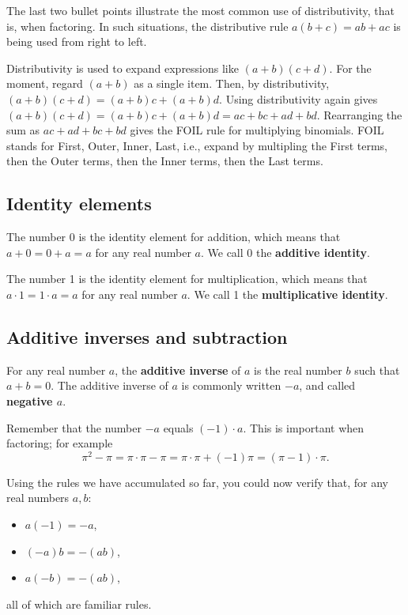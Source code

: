 \documentclass[11pt]{book}               %
\begin{document}
The last two bullet points illustrate the most common use of distributivity, that is, when factoring. 
In such situations, the distributive rule $a (b + c) = ab + a c$  is being used from right to left.

Distributivity is used to expand expressions like $(a + b)(c + d)$.
For the moment, regard $(a + b)$ as a single item.
Then, by distributivity, $(a + b)(c + d) = (a + b)c + (a+b)d$.
Using distributivity again gives $(a + b)(c + d) = (a + b)c + (a+b)d = ac + bc + ad + bd$.
Rearranging the sum as $ac + ad + bc + bd$ gives  the FOIL  rule for multiplying
binomials.  FOIL stands for First, Outer, Inner, Last, i.e., expand by multipling the First terms, then the Outer terms, then the Inner terms, then the Last terms.


\subsection{Identity elements} 

The number 0 is the identity element for addition, which means that
$a + 0 =  0 + a = a$ for any real number $a$.
We call 0 the \textbf{additive identity}.

The number 1 is the identity element for multiplication, which means that
$a \cdot 1  =  1 \cdot a = a$ for any real number $a$.
We call 1 the \textbf{multiplicative identity}.




\subsection{Additive inverses and subtraction}

For any real number $a$, the \textbf{additive inverse} of $a$ is the real number $b$ such that $a + b = 0$.
The additive inverse of $a$ is commonly written $-a$, and called \textbf{negative $a$}. 

Remember that the number $-a$ equals $(-1)\cdot a$. This is important when factoring; for example
$$\pi^2-\pi=\pi\cdot\pi-\pi=\pi\cdot\pi+(-1)\pi=(\pi-1)\cdot\pi.$$
 

%
Using the rules we have accumulated so far, you could now verify that, for any real numbers $a,b$:
\begin{itemize}
    \item $a(-1) = -a$,
    \item $(-a)b = -(ab)$, 
    \item $a(-b) = -(ab)$,
\end{itemize}
all of which are familiar rules.
\end{document}
